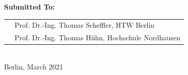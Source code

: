 \begin{titlepage}
\begin{center}
    \vspace{1cm}

    \large \textbf{Submitted To:}

    \vspace{.2cm}

		\begin{tabular}{rl}
			& Prof. Dr.-Ing. Thomas Scheffler, HTW Berlin\\
			& Prof. Dr.-Ing. Thomas Hühn, Hochschule Nordhausen\\
		\end{tabular}\\

    \vspace{2cm}
    \vspace{0.5cm}
    \large Berlin, March 2021\\

  \end{center}
\end{titlepage}
